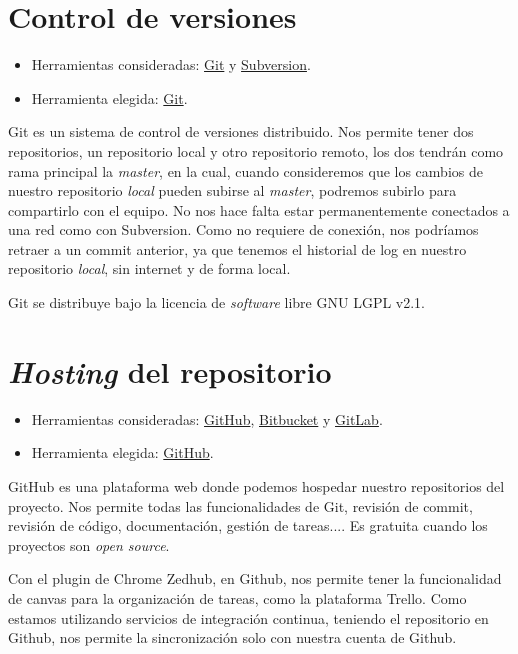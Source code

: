 
\section{Control de versiones}\label{control-de-versiones}

\begin{itemize}
	\tightlist
	\item
	Herramientas consideradas: \href{https://git-scm.com/}{Git} y
	\href{https://subversion.apache.org/}{Subversion}.
	\item
	Herramienta elegida: \href{https://git-scm.com/}{Git}.
\end{itemize}

Git es un sistema de control de versiones distribuido. Nos permite tener dos repositorios, un repositorio local y otro repositorio remoto, los dos tendrán como rama principal la \emph{master}, en la cual, cuando consideremos que los cambios de nuestro repositorio \emph{local} pueden subirse al \emph{master}, podremos subirlo para compartirlo con el equipo.  No nos hace falta estar permanentemente conectados a una red como con Subversion. Como no requiere de conexión, nos podríamos retraer a un commit anterior, ya que tenemos el historial de log en nuestro repositorio \emph{local}, sin internet y de forma local.\cite{web:git}

Git se distribuye bajo la licencia de \emph{software} libre GNU LGPL v2.1.

\section{\emph{Hosting} del repositorio}\label{hosting-del-repositorio}

\begin{itemize}
	\tightlist
	\item
	Herramientas consideradas: \href{https://github.com/}{GitHub},
	\href{https://bitbucket.org/}{Bitbucket} y
	\href{https://gitlab.com/}{GitLab}.
	\item
	Herramienta elegida: \href{https://github.com/}{GitHub}.
\end{itemize}

GitHub es una plataforma web donde podemos hospedar nuestro repositorios del proyecto. Nos permite todas las  funcionalidades de Git, revisión de commit, revisión de código, documentación, gestión de tareas.... Es
gratuita cuando los proyectos son \emph{open source}.

Con el plugin de Chrome Zedhub, en Github, nos permite tener la funcionalidad de canvas para la organización de tareas, como la plataforma Trello. Como estamos utilizando servicios de integración continua, teniendo el repositorio en Github, nos permite la sincronización solo con nuestra cuenta de Github. \cite{web:github}

